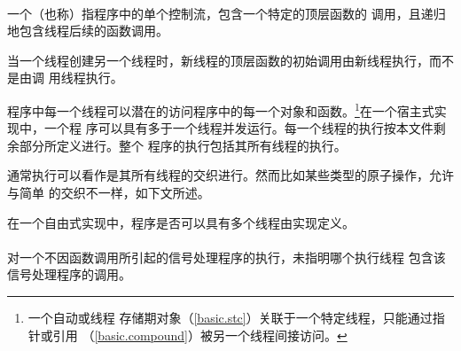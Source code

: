 \paragraph{} %
一个（也称）指程序中的单个控制流，包含一个特定的顶层函数的
调用，且递归地包含线程后续的函数调用。

\begin{note}
  当一个线程创建另一个线程时，新线程的顶层函数的初始调用由新线程执行，而不是由调
  用线程执行。
\end{note}

程序中每一个线程可以潜在的访问程序中的每一个对象和函数。\footnote{一个自动或线程
存储期对象（\ref{basic.stc}）关联于一个特定线程，只能通过指针或引用
（\ref{basic.compound}）被另一个线程间接访问。}在一个宿主式实现中，一个\cpp{}程
序可以具有多于一个线程并发运行。每一个线程的执行按本文件剩余部分所定义进行。整个
程序的执行包括其所有线程的执行。

\begin{note}
  通常执行可以看作是其所有线程的交织进行。然而比如某些类型的原子操作，允许与简单
  的交织不一样，如下文所述。
\end{note}

在一个自由式实现中，程序是否可以具有多个线程由实现定义。

\paragraph{} %
对一个不因函数调用所引起的信号处理程序的执行，未指明哪个执行线程
包含该信号处理程序的调用。
